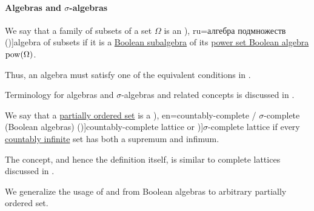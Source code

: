 \paragraph{Algebras and \( \sigma \)-algebras}

\begin{definition}\label{def:algebra_of_subsets}
  We say that a family of subsets of a set \( \Omega \) is an \term[bg=булева алгебра (\cite[def. 3.1]{Драганов2022Мерки}), ru=алгебра подмножеств (\cite[def. II.1.1]{Ширяев2007ВероятностиТом1})]{algebra of subsets} if it is a \hyperref[def:boolean_algebra/submodel]{Boolean subalgebra} of its \hyperref[thm:boolean_algebra_of_subsets]{power set Boolean algebra} \( \operatorname{pow}(\Omega) \).
\end{definition}
\begin{comments}
  \item Thus, an algebra must satisfy one of the equivalent conditions in .
  \item Terminology for algebras and \( \sigma \)-algebras and related concepts is discussed in .
\end{comments}

\begin{definition}\label{def:countably_complete_lattice}\mimprovised
  We say that a \hyperref[def:partially_ordered_set]{partially ordered set} is a \term[ru=(Булева алгебра) счётного типа (\cite[\S 1.6.3]{Владимиров1969БулевыАлгебры}), en=countably-complete / \( \sigma \)-complete (Boolean algebras) (\cite[244]{HalmosGivant2009BooleanAlgebras})]{countably-complete lattice} or \term[en=\( \sigma \)-complete (Boolean algebras) (\cite[244]{HalmosGivant2009BooleanAlgebras})]{\( \sigma \)-complete lattice} if every \hyperref[def:set_countability/countably_infinite]{countably infinite} set has both a supremum and infimum.
\end{definition}
\begin{comments}
  \item The concept, and hence the definition itself, is similar to complete lattices discussed in .
  \item We generalize the usage of \cite[\S 1.6.3]{Владимиров1969БулевыАлгебры} and \cite[244]{HalmosGivant2009BooleanAlgebras} from Boolean algebras to arbitrary partially ordered set.
\end{comments}

